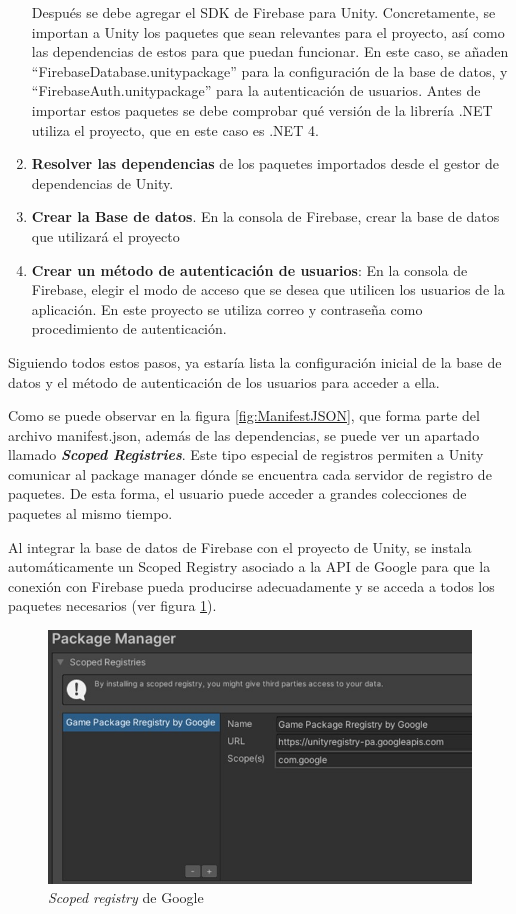 \begin{enumerate}
     Después se debe agregar el SDK de Firebase para Unity. Concretamente, se importan a Unity los paquetes que sean relevantes para el proyecto, así como las dependencias de estos para que puedan funcionar. En este caso, se añaden “FirebaseDatabase.unitypackage” para la configuración de la base de datos, y “FirebaseAuth.unitypackage” para la autenticación de usuarios. Antes de importar estos paquetes se debe comprobar qué versión de la librería .NET utiliza el proyecto, que en este caso es .NET 4.
    \item \textbf{Resolver las dependencias} de los paquetes importados desde el gestor de dependencias de Unity.
    \item \textbf{Crear la Base de datos}. En la consola de Firebase, crear la base de datos que utilizará el proyecto
    \item \textbf{Crear un método de autenticación de usuarios}: En la consola de Firebase, elegir el modo de acceso que se desea que utilicen los usuarios de la aplicación. En este proyecto se utiliza correo y contraseña como procedimiento de autenticación.
\end{enumerate}
Siguiendo todos estos pasos, ya estaría lista la configuración inicial de la base de datos y el método de autenticación de los usuarios para acceder a ella.

Como se puede observar en la figura \ref{fig:ManifestJSON}, que forma parte del archivo manifest.json, además de las dependencias, se puede ver un apartado llamado \textbf{\textit{Scoped Registries}}. Este tipo especial de registros permiten a Unity comunicar al package manager dónde se encuentra cada servidor de registro de paquetes. De esta forma, el usuario puede acceder a grandes colecciones de paquetes al mismo tiempo.

Al integrar la base de datos de Firebase con el proyecto de Unity, se instala automáticamente un Scoped Registry asociado a la API de Google para que la conexión con Firebase pueda producirse adecuadamente y se acceda a todos los paquetes necesarios (ver figura \ref{fig:ScopedRegistry}).
\begin{figure}[h]
    \centering
    \includegraphics[scale=0.45]{img/ScopedRegistry .jpg}
    \caption{\textit{Scoped registry} de Google}
    \label{fig:ScopedRegistry}
    \end{figure}



